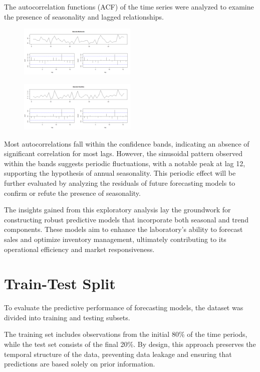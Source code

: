 \documentclass[10pt,twocolumn,letterpaper]{article}
\begin{document}
The autocorrelation functions (ACF) of the time series were analyzed to examine the presence of seasonality and lagged relationships. 
\begin{figure}[H]
    \centering
    \includegraphics[width=0.5\textwidth]{PlotsBEFD/ACF_MAN.png} 
    \caption{}
    \label{fig:esempio}
\end{figure}
\begin{figure}[H]
    \centering
    \includegraphics[width=0.5\textwidth]{PlotsBEFD/ACF_VIC.png} 
    \caption{}
    \label{fig:esempio}
\end{figure}
Most autocorrelations fall within the confidence bands, indicating an absence of significant correlation for most lags. However, the sinusoidal pattern observed within the bands suggests periodic fluctuations, with a notable peak at lag 12, supporting the hypothesis of annual seasonality. This periodic effect will be further evaluated by analyzing the residuals of future forecasting models to confirm or refute the presence of seasonality.

The insights gained from this exploratory analysis lay the groundwork for constructing robust predictive models that incorporate both seasonal and trend components. These models aim to enhance the laboratory's ability to forecast sales and optimize inventory management, ultimately contributing to its operational efficiency and market responsiveness.

\section{Train-Test Split}
To evaluate the predictive performance of forecasting models, the dataset was divided into training and testing subsets.

The training set includes observations from the initial 80\% of the time periods, while the test set consists of the final 20\%. By design, this approach preserves the temporal structure of the data, preventing data leakage and ensuring that predictions are based solely on prior information.
\end{document}
